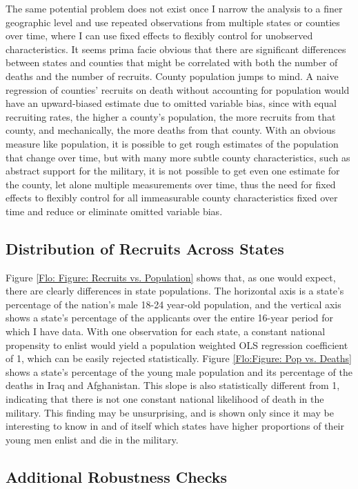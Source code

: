 \documentclass[12pt] {article}
\begin{document}
The same potential problem does not exist once I narrow the analysis
to a finer geographic level and use repeated observations from multiple
states or counties over time, where I can use fixed effects to flexibly control
for unobserved characteristics. It seems prima facie obvious that
there are significant differences between states and counties that
might be correlated with both the number of deaths and the number
of recruits. County population jumps to mind. A naive regression of
counties' recruits on death without accounting for population would
have an upward-biased estimate due to omitted variable bias, since
with equal recruiting rates, the higher a county's population, the
more recruits from that county, and mechanically, the more deaths
from that county. With an obvious measure like population, it is possible
to get rough estimates of the population that change over time, but
with many more subtle county characteristics, such as abstract support
for the military, it is not possible to get even one estimate for
the county, let alone multiple measurements over time, thus the need
for fixed effects to flexibly control for all immeasurable county
characteristics fixed over time and reduce or eliminate omitted variable bias.

\subsection{Distribution of Recruits Across States}
Figure \ref{Flo: Figure: Recruits vs. Population}
shows that, as one would expect, there are clearly differences in
state populations. The horizontal axis is a state's percentage of
the nation's male 18-24 year-old population, and the vertical axis
shows a state's percentage of the applicants over the entire 16-year
period for which I have data. With one observation for each state,
a constant national propensity to enlist would yield a population
weighted OLS regression coefficient of 1, which can be easily rejected
statistically. Figure \ref{Flo:Figure: Pop vs. Deaths} shows a state's
percentage of the young male population and its percentage of the
deaths in Iraq and Afghanistan. This slope is also statistically different
from 1, indicating that there is not one constant national likelihood
of death in the military. This finding may be unsurprising, and is
shown only since it may be interesting to know in and of itself which
states have higher proportions of their young men enlist and die in
the military. 

\subsection {Additional Robustness Checks}
\end{document}
